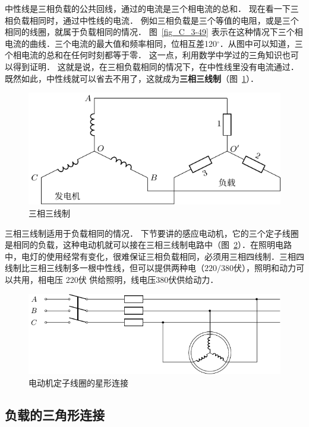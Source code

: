 中性线是三相负载的公共回线，通过的电流是三个相电流的总和．
现在看一下三相负载相同时，通过中性线的电流．
例如三相负载是三个等值的电阻，或是三个相同的线圈，就属于负载相同的情况．
图~\ref{fig_C_3-49} 表示在这种情况下三个相电流的曲线．三个电流的最大值和频率相同，位相互差120$^\circ$．从图中可以知道，三个相电流的总和在任何时刻都等于零．
这一点，利用数学中学过的三角知识也可以得到证明．
这就是说，在三相负载相同的情况下，在中性线里没有电流通过．
既然如此，中性线就可以省去不用了，这就成为\textbf{三相三线制}（图~\ref{fig_C_3-50}）．


\begin{figure}[htbp]
\centering
\includegraphics{fig/C/3-50.pdf}
\caption{三相三线制}\label{fig_C_3-50}
\end{figure}

三相三线制适用于负载相同的情况．
下节要讲的感应电动机，它的三个定子线圈是相同的负载，这种电动机就可以接在三相三线制电路中（图~\ref{fig_C_3-51}）．在照明电路中，电灯的使用经常有变化，很难保证三相负载相同，必须用三相四线制．三相四线制比三相三线制多一根中性线，但可以提供两种电（$220/380$伏），照明和动力可以共用，相电压 220伏 供给照明，线电压380伏供给动力．
\begin{figure}[htbp]
    \centering
    \includegraphics{fig/C/3-51.pdf}
    \caption{电动机定子线圈的星形连接}\label{fig_C_3-51}
\end{figure}

\subsection{负载的三角形连接}

